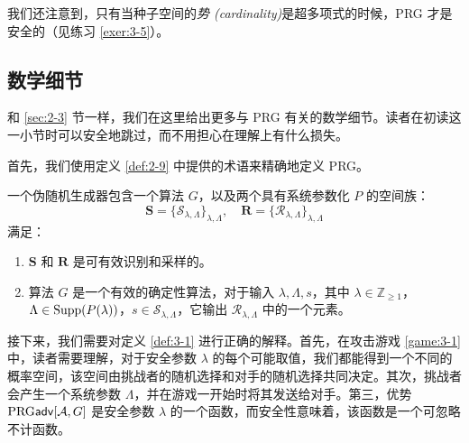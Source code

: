 我们还注意到，只有当种子空间的\emph{势 (cardinality)}是超多项式的时候，PRG 才是安全的（见练习 \ref{exer:3-5}）。

\subsection{数学细节}\label{subsec:3-1-2}

和 \ref{sec:2-3} 节一样，我们在这里给出更多与 PRG 有关的数学细节。读者在初读这一小节时可以安全地跳过，而不用担心在理解上有什么损失。

首先，我们使用定义 \ref{def:2-9} 中提供的术语来精确地定义 PRG。

\begin{definition}[伪随机生成器]\label{def:3-2}
一个伪随机生成器包含一个算法 $G$，以及两个具有系统参数化 $P$ 的空间族：
\[
\mathbf{S}=\{\mathcal{S}_{\lambda,\Lambda}\}_{\lambda,\Lambda},\quad
\mathbf{R}=\{\mathcal{R}_{\lambda,\Lambda}\}_{\lambda,\Lambda}
\]
满足：
\begin{enumerate}
	\item $\mathbf{S}$ 和 $\mathbf{R}$ 是可有效识别和采样的。
	\item 算法 $G$ 是一个有效的确定性算法，对于输入 $\lambda,\Lambda,s$，其中 $\lambda\in\mathbb{Z}_{\geq1}$，$\Lambda\in{\rm Supp}(P(\lambda))$，$s\in\mathcal{S}_{\lambda,\Lambda}$，它输出 $\mathcal{R}_{\lambda,\Lambda}$ 中的一个元素。
\end{enumerate}
\end{definition}

接下来，我们需要对定义 \ref{def:3-1} 进行正确的解释。首先，在攻击游戏 \ref{game:3-1} 中，读者需要理解，对于安全参数 $\lambda$ 的每个可能取值，我们都能得到一个不同的概率空间，该空间由挑战者的随机选择和对手的随机选择共同决定。其次，挑战者会产生一个系统参数 $\Lambda$，并在游戏一开始时将其发送给对手。第三，优势 ${\rm PRG\mathsf{adv}}[\mathcal{A},G]$ 是安全参数 $\lambda$ 的一个函数，而安全性意味着，该函数是一个可忽略不计函数。